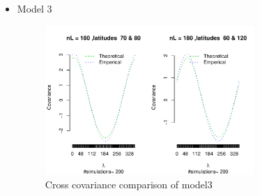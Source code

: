 \begin{itemize}
\item Model 3
\begin{figure}[H]
\begin{center}
\includegraphics [width=0.75\textwidth ]{graphs/Model3.pdf}
\caption{Cross covariance comparison of model3}
\end{center}
\end{figure}

\end{itemize}


%